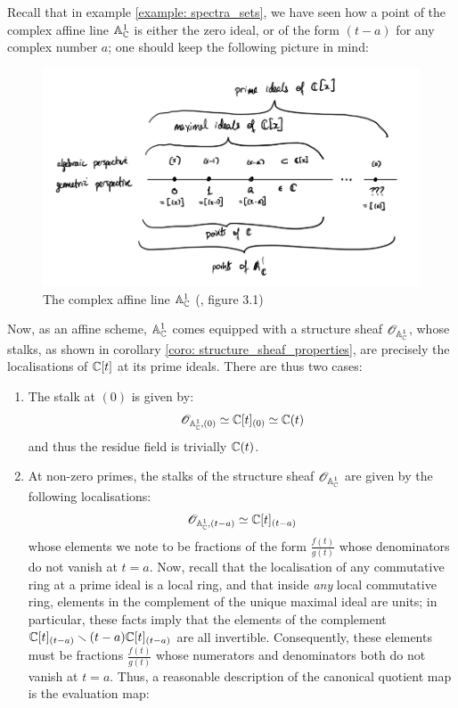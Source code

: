             \begin{example}
                Recall that in example \ref{example: spectra_sets}, we have seen how a point of the complex affine line $\mathbb{A}^1_{\mathbb{C}}$ is either the zero ideal, or of the form $(t - a)$ for any complex number $a$; one should keep the following picture in mind:
                    \begin{figure}[H]
				        \centering
				        \includegraphics[width=\linewidth,height=\textheight,keepaspectratio]{Figures/complex affine line.png}
				        \caption{The complex affine line $\mathbb{A}^1_{\mathbb{C}}$ (\cite{risingsea}, figure 3.1)}
				        \label{fig: complex_affine_line_stalks}
				    \end{figure}
			    \noindent
			    Now, as an affine scheme, $\mathbb{A}^1_{\mathbb{C}}$ comes equipped with a structure sheaf $\mathscr{O}_{\mathbb{A}^1_{\mathbb{C}}}$, whose stalks, as shown in corollary \ref{coro: structure_sheaf_properties}, are precisely the localisations of $\mathbb{C}[t]$ at its prime ideals. There are thus two cases:
			        \begin{enumerate}
			            \item The stalk at $(0)$ is given by:
			                $$\mathscr{O}_{\mathbb{A}^1_{\mathbb{C}}, (0)} \simeq \mathbb{C}[t]_{(0)} \simeq \mathbb{C}(t)$$
		                and thus the residue field is trivially $\mathbb{C}(t)$.
			            \item At non-zero primes, the stalks of the structure sheaf $\mathscr{O}_{\mathbb{A}^1_{\mathbb{C}}}$ are given by the following localisations:
			                $$\mathscr{O}_{\mathbb{A}^1_{\mathbb{C}}, (t - a)} \simeq \mathbb{C}[t]_{(t - a)}$$
		                whose elements we note to be fractions of the form $\frac{f(t)}{g(t)}$ whose denominators do not vanish at $t = a$. Now, recall that the localisation of any commutative ring at a prime ideal is a local ring, and that inside \textit{any} local commutative ring, elements in the complement of the unique maximal ideal are units; in particular, these facts imply that the elements of the complement $\mathbb{C}[t]_{(t - a)} \smallsetminus (t - a)\mathbb{C}[t]_{(t - a)}$ are all invertible. Consequently, these elements must be fractions $\frac{f(t)}{g(t)}$ whose numerators and denominators both do not vanish at $t = a$. Thus, a reasonable description of the canonical quotient map is the evaluation map:

\end{enumerate}
\end{example}
